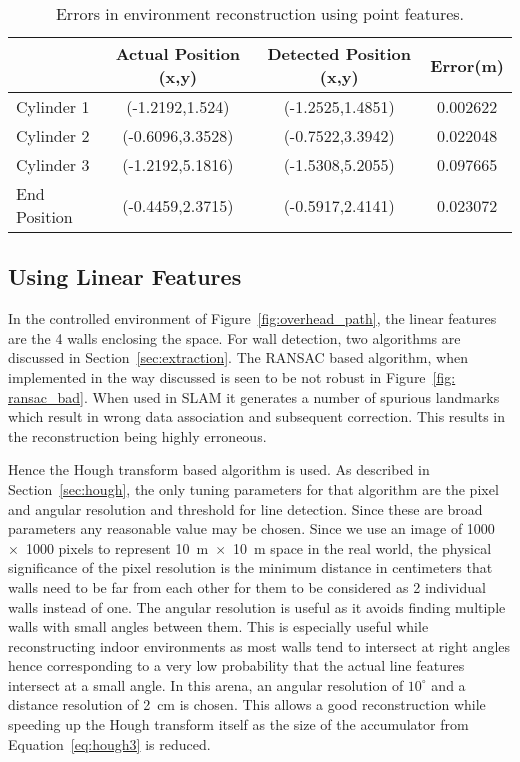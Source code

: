 \begin{table}
\caption{Errors in environment reconstruction using point features.}
\label{tab:cylinder_results}
\begin{tabular}{| l | c | c | c |}
\hline ~ & Actual Position (x,y) & Detected Position (x,y) & Error(m)\\
\hline Cylinder 1 & (-1.2192,1.524) & (-1.2525,1.4851) & 0.002622 \\ 
\hline Cylinder 2 & (-0.6096,3.3528) & (-0.7522,3.3942) & 0.022048 \\ 
\hline Cylinder 3 & (-1.2192,5.1816) & (-1.5308,5.2055) & 0.097665 \\ 
\hline End Position & (-0.4459,2.3715) & (-0.5917,2.4141) & 0.023072 \\
\hline 
\end{tabular} 
\end{table}

\subsection{Using Linear Features}
\label{sec: hough_results}

In the controlled environment of Figure~\ref{fig:overhead_path}, the linear features are the 4 walls enclosing the space. For wall detection, two algorithms are discussed in Section~\ref{sec:extraction}. The RANSAC based algorithm, when implemented in the way discussed is seen to be not robust in Figure~\ref{fig: ransac_bad}. When used in SLAM it generates a number of spurious landmarks which result in wrong data association and subsequent correction. This results in the reconstruction being highly erroneous. 

Hence the Hough transform based algorithm is used. As described in Section~\ref{sec:hough}, the only tuning parameters for that algorithm are the pixel and angular resolution and threshold for line detection. Since these are broad parameters any reasonable value may be chosen. Since we use an image of 1000~$ \times $~1000 pixels to represent 10~m~$ \times $~10~m space in the real world, the physical significance of the pixel resolution is the minimum distance in centimeters that walls need to be far from each other for them to be considered as 2 individual walls instead of one. The angular resolution is useful as it avoids finding multiple walls with small angles between them. This is especially useful while reconstructing indoor environments as most walls tend to intersect at right angles hence corresponding to a very low probability that the actual line features intersect at a small angle. In this arena, an angular resolution of $ 10^\circ $ and a distance resolution of 2~cm is chosen. This allows a good reconstruction while speeding up the Hough transform itself as the size of the accumulator from Equation~\ref{eq:hough3} is reduced. 

